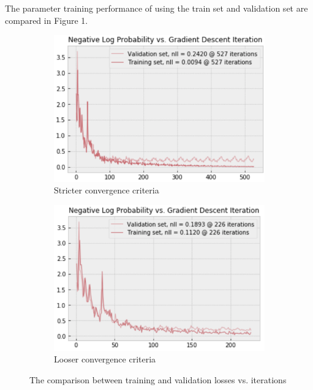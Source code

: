 \documentclass{article} %
\begin{document}
  The parameter training performance of using the train set and validation set are compared in Figure 1.
  \begin{figure}[!hb]
    \centering
    \begin{subfigure}[b]{0.45\linewidth}
      \includegraphics[width=\linewidth]{A4_1_1.png}
      \caption{Stricter convergence criteria}
    \end{subfigure}
    \begin{subfigure}[b]{0.45\linewidth}
      \includegraphics[width=\linewidth]{A4_1_2.png}
      \caption{Looser convergence criteria}
    \end{subfigure}
    \caption{The comparison between training and validation losses vs. iterations}
    \label{fig:Q1_1}
  \end{figure}
\end{document}
